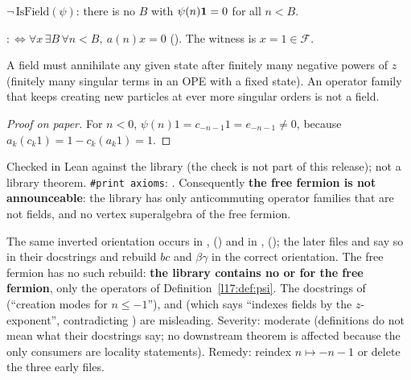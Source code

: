 \begin{theorem}\label{l17:thm:psinotfield}
$\neg\,\mathrm{IsField}(\psi)$: there is no $B$ with $\psi(n)\mathbf{1}=0$ for all $n<B$.
\end{theorem}
\begin{dictionary}
 $:\Leftrightarrow\forall x\,\exists B\,\forall n<B,\ a(n)x=0$ (). The witness is $x=1\in\mathcal F$.
\end{dictionary}
\begin{physics}
A field must annihilate any given state after finitely many negative powers of $z$ (finitely many
singular terms in an OPE with a fixed state). An operator family that keeps creating new particles at
ever more singular orders is not a field.
\end{physics}
\begin{proof}[Proof on paper]
For $n<0$, $\psi(n)1=c_{-n-1}1=e_{-n-1}\neq0$, because $a_k(c_k1)=1-c_k(a_k1)=1$.
\end{proof}
\begin{status}
Checked in Lean against the library (the check is not part of this release); not a library theorem. \texttt{\#print axioms}: . Consequently \textbf{the free
fermion is not announceable}: the library has only anticommuting operator families that are not fields, and no vertex
superalgebra of the free fermion.
\end{status}

\begin{warning}[title={Findings (F3): the free fermion is not a vertex superalgebra in Lean}]
The same inverted orientation occurs in , 
() and in , 
(); the later files  and
 say so in their docstrings and rebuild $bc$ and $\beta\gamma$ in the
correct orientation. The free fermion has no such rebuild: \textbf{the library contains no
 or  for the free fermion}, only the
operators of Definition~\ref{l17:def:psi}. The docstrings of 
(``creation modes for $n\le-1$''),  and 
(which says  ``indexes fields by the $z$-exponent'', contradicting
) are misleading. Severity: moderate (definitions do not mean what their
docstrings say; no downstream theorem is affected because the only consumers are locality
statements). Remedy: reindex $n\mapsto -n-1$ or delete the three early files.
\end{warning}

